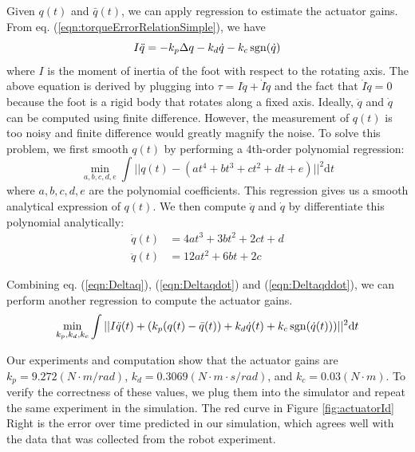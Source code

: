 Given $q(t)$ and $\bar{q}(t)$, we can apply regression to estimate the actuator gains. From eq. (\ref{eqn:torqueErrorRelationSimple}), we have
\begin{equation}
I\ddot{q}=-k_p\Delta q - k_d\dot{q} - k_c\operatorname{sgn}(\dot{q})
\end{equation}
where $I$ is the moment of inertia of the foot with respect to the rotating axis. The above equation is derived by plugging into $\tau = I\ddot{q}+\dot{I}\dot{q}$ and the fact that $\dot{I}\dot{q}=0$ because the foot is a rigid body that rotates along a fixed axis. Ideally, $\ddot{q}$ and $\dot{q}$ can be computed using finite difference. However, the measurement of $q(t)$ is too noisy and finite difference would greatly magnify the noise. To solve this problem, we first smooth $q(t)$ by performing a 4th-order polynomial regression:
\begin{equation}
  \min_{a,b,c,d,e}\int ||q(t)-(at^4+bt^3+ct^2+dt+e)||^2\mathrm{d}t
  \label{eqn:Deltaq}
\end{equation}
where $a,b,c,d,e$ are the polynomial coefficients. This regression gives us a smooth analytical expression of $q(t)$. We then compute $\ddot{q}$ and $\dot{q}$ by differentiate this polynomial analytically:
\begin{align}
\label{eqn:Deltaqdot}  \dot{q}(t)&=4at^3+3bt^2+2ct+d\\
\label{eqn:Deltaqddot}  \ddot{q}(t)&=12at^2+6bt+2c
\end{align}

Combining eq. (\ref{eqn:Deltaq}), (\ref{eqn:Deltaqdot}) and (\ref{eqn:Deltaqddot}), we can perform another regression to compute the actuator gains.
\begin{equation}
\min_{k_p, k_d, k_c}\int||I\ddot{q}(t)+(k_p(q(t)-\bar{q}(t)) + k_d\dot{q}(t) + k_c\operatorname{sgn}(\dot{q}(t)))||^2\mathrm{d}t
\end{equation}

Our experiments and computation show that the actuator gains are $k_p=9.272(N\cdot m/rad)$, $k_d=0.3069(N\cdot m\cdot s/rad)$, and $k_c=0.03(N\cdot m)$. To verify the correctness of these values, we plug them into the simulator and repeat the same experiment in the simulation. The red curve in Figure \ref{fig:actuatorId} Right is the error over time predicted in our simulation, which agrees well with the data that was collected from the robot experiment.


